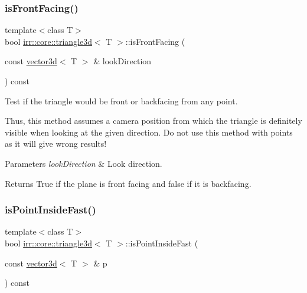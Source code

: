 \subsubsection{\texorpdfstring{is\+Front\+Facing()}{isFrontFacing()}}
{\footnotesize\ttfamily template$<$class T$>$ \\
bool \hyperlink{classirr_1_1core_1_1triangle3d}{irr\+::core\+::triangle3d}$<$ T $>$\+::is\+Front\+Facing (\begin{DoxyParamCaption}\item[{const \hyperlink{classirr_1_1core_1_1vector3d}{vector3d}$<$ T $>$ \&}]{look\+Direction }\end{DoxyParamCaption}) const\hspace{0.3cm}{\ttfamily [inline]}}



Test if the triangle would be front or backfacing from any point. 

Thus, this method assumes a camera position from which the triangle is definitely visible when looking at the given direction. Do not use this method with points as it will give wrong results! 
\begin{DoxyParams}{Parameters}
{\em look\+Direction} & Look direction. \\
\hline
\end{DoxyParams}
\begin{DoxyReturn}{Returns}
True if the plane is front facing and false if it is backfacing. 
\end{DoxyReturn}
\mbox{\label{classirr_1_1core_1_1triangle3d_a87d93ff616faf4b99b59f8d2ecd9c0de}} 
\subsubsection{\texorpdfstring{is\+Point\+Inside\+Fast()}{isPointInsideFast()}}
{\footnotesize\ttfamily template$<$class T$>$ \\
bool \hyperlink{classirr_1_1core_1_1triangle3d}{irr\+::core\+::triangle3d}$<$ T $>$\+::is\+Point\+Inside\+Fast (\begin{DoxyParamCaption}\item[{const \hyperlink{classirr_1_1core_1_1vector3d}{vector3d}$<$ T $>$ \&}]{p }\end{DoxyParamCaption}) const\hspace{0.3cm}{\ttfamily [inline]}}



